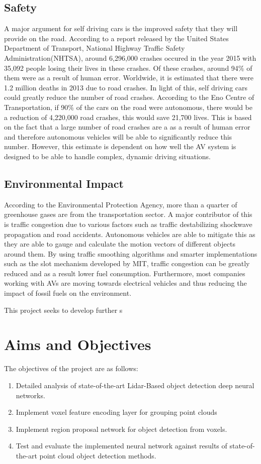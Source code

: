 \subsection{Safety}
A major argument for self driving cars is the improved safety that they will provide on the road. According to a report released by the United States Department of Transport, National Highway Traffic Safety Administration(NHTSA), around 6,296,000 crashes occured in the year 2015 with 35,092 people losing their lives in these crashes. Of these crashes, around 94\% of them were as a result of human error. Worldwide, it is estimated that there were 1.2 million deaths in 2013 due to road crashes. 
In light of this, self driving cars could greatly reduce the number of road crashes. According to the Eno Centre of Transportation, if 90\% of the cars on the road were autonomous, there would be a reduction of 4,220,000 road crashes, this would save 21,700 lives. This is based on the fact that a large number of road crashes are a as a result of human error and therefore autonomous vehicles will be able to significantly reduce this number. 
However, this estimate is dependent on how well the AV system is designed to be able to handle complex, dynamic driving situations. 

\subsection{Environmental Impact}

According to the Environmental Protection Agency, more than a  quarter of greenhouse gases are from the transportation sector. A major contributor of this is traffic congestion due to various factors such as traffic destabilizing shockwave propagation and road accidents. Autonomous vehicles are able to mitigate this as they are able to gauge and calculate the motion vectors of different objects around them. By using traffic smoothing algorithms and smarter implementations such as the slot mechanism developed by MIT, traffic congestion can be greatly reduced and as a result lower fuel consumption. Furthermore, most companies working with AVs are moving towards electrical vehicles and thus reducing the impact of fossil fuels on the environment. 


This project seeks to develop further s



\section{Aims and Objectives}
The objectives of the  project are as follows:
\begin{enumerate}
	\item Detailed analysis of state-of-the-art Lidar-Based object detection deep neural networks.
	\item Implement voxel feature encoding layer for grouping point clouds
	\item Implement region proposal network for object detection from voxels.
	\item Test and evaluate the implemented neural network against results of state-of-the-art point cloud object detection methods.
\end{enumerate}

